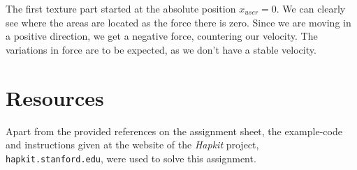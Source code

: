   The first texture part started at the absolute position $x_{user} = 0$. We can clearly see where the areas are located as the force there is zero. Since we are moving in a positive direction, we get a negative force, countering our velocity. The variations in force are to be expected, as we don't have a stable velocity.

  \section*{Resources}

  Apart from the provided references on the assignment sheet, the example-code and instructions given at the website of the \textit{Hapkit} project,\\ \texttt{hapkit.stanford.edu}, were used to solve this assignment.

